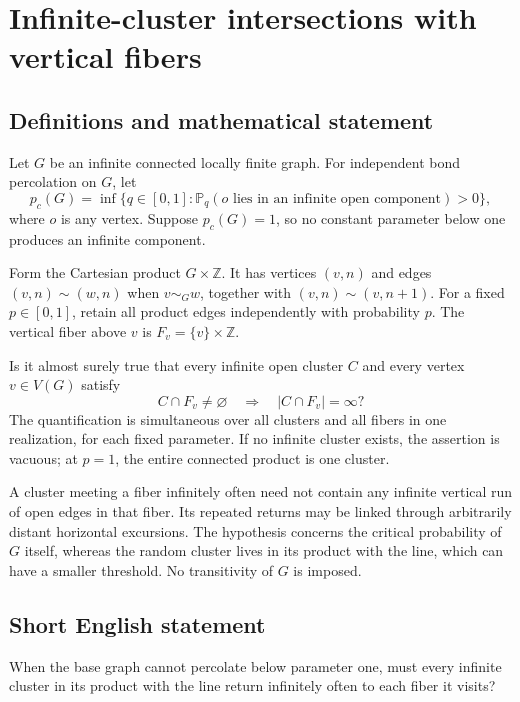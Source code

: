 \documentclass[11pt,a4paper]{article}
\begin{document}
\section*{Infinite-cluster intersections with vertical fibers}\label{statement}

\subsection{Definitions and mathematical statement}
Let $G$ be an infinite connected locally finite graph. For independent bond percolation on $G$, let
\[
p_c(G)=\inf\{q\in[0,1]:\mathbb P_q(o\text{ lies in an infinite open component})>0\},
\]
where $o$ is any vertex. Suppose $p_c(G)=1$, so no constant parameter below one produces an infinite component.

Form the Cartesian product $G\times\mathbb Z$. It has vertices $(v,n)$ and edges $(v,n)\sim(w,n)$ when $v\sim_Gw$, together with $(v,n)\sim(v,n+1)$. For a fixed $p\in[0,1]$, retain all product edges independently with probability $p$. The vertical fiber above $v$ is $F_v=\{v\}\times\mathbb Z$.

Is it almost surely true that every infinite open cluster $C$ and every vertex $v\in V(G)$ satisfy
\[
C\cap F_v\ne\varnothing\quad\Longrightarrow\quad |C\cap F_v|=\infty?
\]
The quantification is simultaneous over all clusters and all fibers in one realization, for each fixed parameter. If no infinite cluster exists, the assertion is vacuous; at $p=1$, the entire connected product is one cluster.

A cluster meeting a fiber infinitely often need not contain any infinite vertical run of open edges in that fiber. Its repeated returns may be linked through arbitrarily distant horizontal excursions. The hypothesis concerns the critical probability of $G$ itself, whereas the random cluster lives in its product with the line, which can have a smaller threshold. No transitivity of $G$ is imposed.
\subsection{Short English statement}
When the base graph cannot percolate below parameter one, must every infinite cluster in its product with the line return infinitely often to each fiber it visits?
\end{document}
